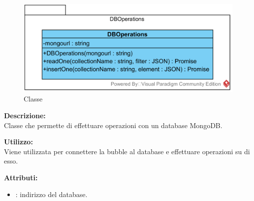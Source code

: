 


%

\subparagraph[::DBOperations]{\class}\mbox{}\\ \label{\class}
\begin{figure}[H]
	\centering
	\includegraphics[width=15cm]{./diagrammi/framework/model/api/dboperations.png}
	\caption{Classe \class}
\end{figure}

\textbf{Descrizione:}\\
Classe che permette di effettuare operazioni con un database MongoDB.

\textbf{Utilizzo:}\\
Viene utilizzata per connettere la bubble al database e effettuare operazioni su di esso.



\textbf{Attributi:}
\begin{itemize}
	\item {}: indirizzo del database.
\end{itemize}

